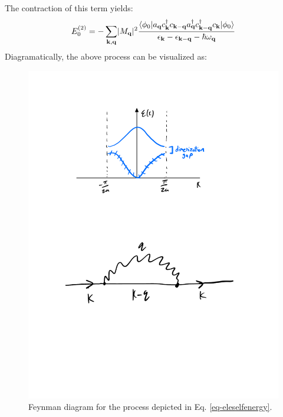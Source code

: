 The contraction of this term yields:
\begin{equation}\label{eq-eleselfenergy}
    E_0^{(2)} = -\sum_{\mathbf{k}, \mathbf{q}}\lvert M_{\mathbf{q}} \rvert^2 \frac{\langle \phi_0 \rvert a_{\mathbf{q}}c^\dagger_{\mathbf{k}}c_{\mathbf{k} - \mathbf{q}}a^\dagger_{\mathbf{q}}c^\dagger_{\mathbf{k} - \mathbf{q}}c_{\mathbf{k}}\lvert \phi_0 \rangle}{\epsilon_{\mathbf{k}} - \epsilon_{\mathbf{k} - \mathbf{q}} - \hbar \omega_{\mathbf{q}}}
\end{equation}
Diagramatically, the above process can be visualized as:

\begin{figure}[htbp]
    \centering
    \includegraphics[scale=0.5]{Images/fig-polaronfeynman.pdf}
    \caption{Feynman diagram for the process depicted in Eq. \eqref{eq-eleselfenergy}.}
    \label{fig-polaronfeynman}
\end{figure}

